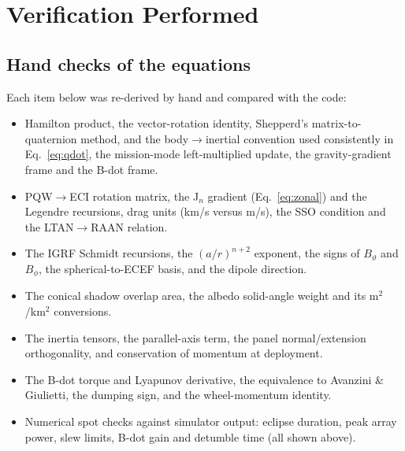 \documentclass[11pt,a4paper]{article}
\begin{document}
\section{Verification Performed}\label{sec:verif}

\subsection{Hand checks of the equations}
Each item below was re-derived by hand and compared with the code:
\begin{itemize}
\item Hamilton product, the vector-rotation identity, Shepperd's matrix-to-quaternion method, and the body$\to$inertial convention used consistently in Eq.~\eqref{eq:qdot}, the mission-mode left-multiplied update, the gravity-gradient frame and the B-dot frame.
\item PQW$\to$ECI rotation matrix, the J$_n$ gradient (Eq.~\eqref{eq:zonal}) and the Legendre recursions, drag units (km/s versus m/s), the SSO condition and the LTAN$\to$RAAN relation.
\item The IGRF Schmidt recursions, the $(a/r)^{n+2}$ exponent, the signs of $B_\vartheta$ and $B_\phi$, the spherical-to-ECEF basis, and the dipole direction.
\item The conical shadow overlap area, the albedo solid-angle weight and its m$^2$/km$^2$ conversions.
\item The inertia tensors, the parallel-axis term, the panel normal/extension orthogonality, and conservation of momentum at deployment.
\item The B-dot torque and Lyapunov derivative, the equivalence to Avanzini \& Giulietti, the dumping sign, and the wheel-momentum identity.
\item Numerical spot checks against simulator output: eclipse duration, peak array power, slew limits, B-dot gain and detumble time (all shown above).
\end{itemize}
\end{document}
